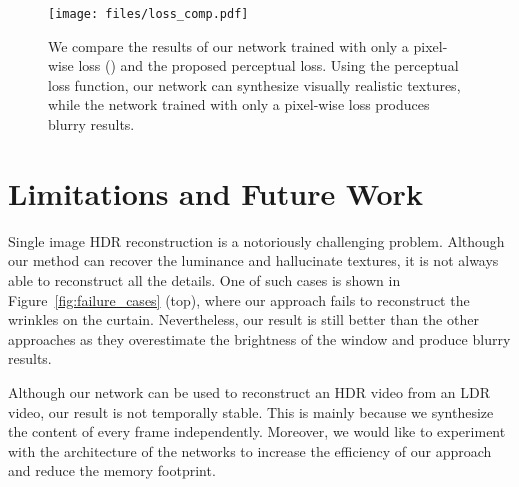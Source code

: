 \begin{figure}
  \texttt{[image: files/loss\_comp.pdf]}
  \vspace{-0.30in}
  \caption{We compare the results of our network trained with only a pixel-wise loss () and the proposed perceptual loss. Using the perceptual loss function, our network can synthesize visually realistic textures, while the network trained with only a pixel-wise loss produces blurry results.}
  \label{fig:loss_comp}
  \vspace{-0.20in}
\end{figure}





\section{Limitations and Future Work}



Single image HDR reconstruction is a notoriously challenging problem. Although our method can recover the luminance and hallucinate textures, it is not always able to reconstruct all the details. One of such cases is shown in Figure~\ref{fig:failure_cases} (top), where our approach fails to reconstruct the wrinkles on the curtain. Nevertheless, our result is still better than the other approaches as they overestimate the brightness of the window and produce blurry results. 

Although our network can be used to reconstruct an HDR video from an LDR video, our result is not temporally stable. This is mainly because we synthesize the content of every frame independently.  Moreover, we would like to experiment with the architecture of the networks to increase the efficiency of our approach and reduce the memory footprint.

